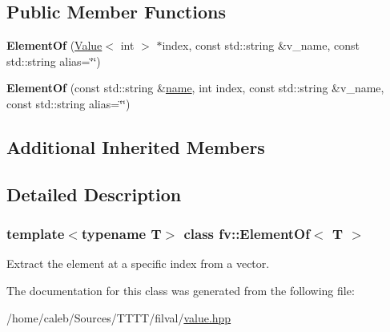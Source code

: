 \subsection*{Public Member Functions}
\begin{DoxyCompactItemize}
\item 
\hypertarget{classfv_1_1ElementOf_ae43a7e9890d411b6cbfa28232f375695}{}\label{classfv_1_1ElementOf_ae43a7e9890d411b6cbfa28232f375695} 
{\bfseries Element\+Of} (\hyperlink{classfv_1_1Value}{Value}$<$ int $>$ $\ast$index, const std\+::string \&v\+\_\+name, const std\+::string alias=\char`\"{}\char`\"{})
\item 
\hypertarget{classfv_1_1ElementOf_acce67227b0a453836636433288fc85b3}{}\label{classfv_1_1ElementOf_acce67227b0a453836636433288fc85b3} 
{\bfseries Element\+Of} (const std\+::string \&\hyperlink{classfv_1_1GenValue_a610f89ee441eaad4c9e78f74d6bde93b}{name}, int index, const std\+::string \&v\+\_\+name, const std\+::string alias=\char`\"{}\char`\"{})
\end{DoxyCompactItemize}
\subsection*{Additional Inherited Members}


\subsection{Detailed Description}
\subsubsection*{template$<$typename T$>$\newline
class fv\+::\+Element\+Of$<$ T $>$}

Extract the element at a specific index from a vector. 

The documentation for this class was generated from the following file\+:\begin{DoxyCompactItemize}
\item 
/home/caleb/\+Sources/\+T\+T\+T\+T/filval/\hyperlink{value_8hpp}{value.\+hpp}\end{DoxyCompactItemize}
